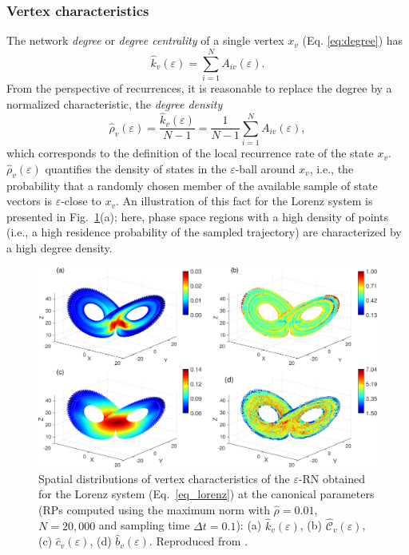 				\subsubsection{Vertex characteristics}
        				The network \textit{degree} or \textit{degree centrality} of a single vertex $x_v$ (Eq. \eqref{eq:degree}) has 
\begin{equation}
\hat{k}_v(\varepsilon)=\sum_{i=1}^N A_{iv}(\varepsilon). 
\label{eq:degree}
\end{equation}
 From the perspective of recurrences, it is reasonable to replace the degree by a normalized characteristic, the \textit{degree density}
\begin{equation}
\hat{\rho}_v(\varepsilon)=\frac{\hat{k}_v(\varepsilon)}{N-1}=\frac{1}{N-1} \sum_{i=1}^N A_{iv}(\varepsilon),
\label{eq:locrho}
\end{equation}
\noindent
which corresponds to the definition of the local recurrence rate of the state $x_v$. $\hat{\rho}_v(\varepsilon)$ quantifies the density of states in the $\varepsilon$-ball around $x_v$, i.e., the probability that a randomly chosen member of the available sample of state vectors is $\varepsilon$-close to $x_v$. An illustration of this fact for the Lorenz system is presented in Fig.~\ref{fig:local}(a); here, phase space regions with a high density of points (i.e., a high residence probability of the sampled trajectory) are characterized by a high degree density.
\begin{figure}
	\centering
	\includegraphics[width=\columnwidth]{Chapter03_RecurrenceNt/phase_deg_cc_cls_btwLoenz.eps}
\caption{Spatial distributions of vertex characteristics of the $\varepsilon$-RN obtained for the Lorenz system (Eq.~\ref{eq_lorenz}) at the canonical parameters (RPs computed using the maximum norm with $\hat{\rho}=0.01$, $N=20,000$ and sampling time $\Delta t=0.1$): (a) $\hat{k}_v(\varepsilon)$, (b) $\hat{\mathcal{C}}_v(\varepsilon)$, (c) $\hat{c}_v(\varepsilon)$, (d) $\hat{b}_v(\varepsilon)$. Reproduced from \cite{Donner2010a}. } \label{fig:local}
\end{figure}

